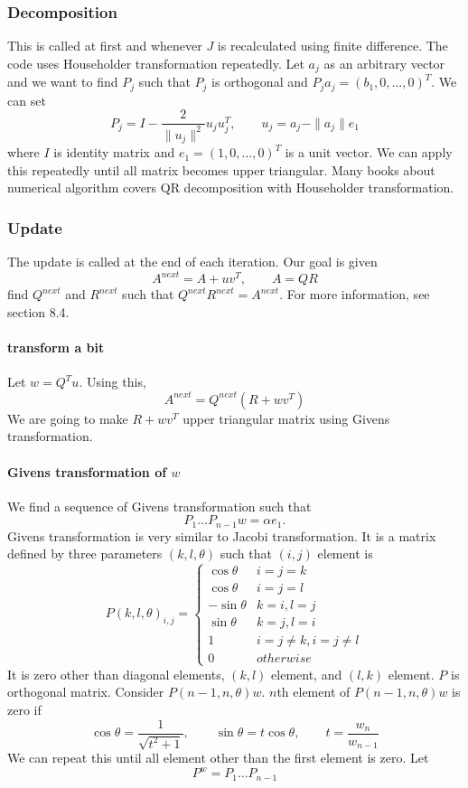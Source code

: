 \documentclass[12pt]{article}
\begin{document}
\subsubsection{Decomposition}
This is called at first and whenever $J$ is recalculated using finite difference.  The code uses
Householder transformation repeatedly. Let $a_j$ as an arbitrary vector and we want to find $P_j$
such that $P_j$ is orthogonal and $P_ja_j = (b_1, 0, \dots,0)^T$. We can set
\[
P_j = I - \frac{2}{\|u_j\|^2} u_ju_j^T, \qquad u_j = a_j - \|a_j\|e_1
\]
where $I$ is identity matrix and $e_1= (1,0,\dots,0)^T$ is a unit vector. We can apply this
repeatedly until all matrix becomes upper triangular. Many books about numerical algorithm covers
QR decomposition with Householder transformation. 




\subsubsection{Update}
The update is called at the end of each iteration. Our goal is given
\[
A^{next} = A + uv^T, \qquad A = QR
\]
find $Q^{next}$ and $R^{next}$ such that $Q^{next}R^{next}=A^{next}$. For more information, see \cite{BjorckDahlquist2008}
section 8.4. 

\paragraph{transform a bit}
Let $w=Q^Tu$. Using this, 
\[
A^{next} = Q^{next}(R+wv^T)
\]
We are going to make $R+wv^T$ upper triangular matrix using Givens transformation.

\paragraph{Givens transformation of $w$}
We find a sequence of Givens transformation such that 
\[
P_1\dots P_{n-1}w = \alpha e_1.
\]
Givens transformation is very similar to Jacobi transformation. It is a matrix defined by three
parameters $(k,l,\theta)$ such that $(i,j)$
element is 
\[
P(k,l,\theta)_{i,j} = \begin{cases}
\cos \theta & i=j=k \\
\cos \theta & i=j = l\\
-\sin \theta & k = i , l = j \\
\sin \theta & k = j, l=i \\
1 & i = j \neq k, i = j \neq l\\
0 & otherwise
\end{cases}
\]
It is zero other than diagonal elements, $(k,l)$ element, and $(l,k)$ element. $P$ is orthogonal
matrix.  Consider
$P(n-1,n,\theta) w$.  $n$th element of $P(n-1,n,\theta) w$ is zero if
\[
\cos \theta = \frac{1}{\sqrt{t^2+1}}, \qquad
\sin \theta = t \cos \theta, \qquad t = \frac{w_n}{w_{n-1}}
\]
We can repeat this until all element other than the first element is zero. 
Let 
\[
P^w = P_1\dots P_{n-1}
\]
\end{document}
